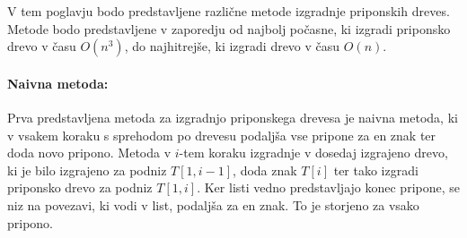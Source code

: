 V tem poglavju bodo predstavljene različne metode izgradnje priponskih dreves. Metode bodo predstavljene v zaporedju od najbolj počasne, ki izgradi priponsko drevo v času $O(n^3)$, do najhitrejše, ki izgradi drevo v času $O(n)$. 

\paragraph{Naivna metoda:}
Prva predstavljena metoda za izgradnjo priponskega drevesa je naivna metoda, ki v vsakem koraku s sprehodom po drevesu podaljša vse pripone za en znak ter doda novo pripono. Metoda v $i$-tem koraku izgradnje v dosedaj izgrajeno drevo, ki je bilo izgrajeno za podniz $T[1,i-1]$, doda znak $T[i]$ ter tako izgradi priponsko drevo za podniz $T[1,i]$.
Ker listi vedno predstavljajo konec pripone, se niz na povezavi, ki vodi v list, podaljša za en znak. To je storjeno za vsako pripono.

